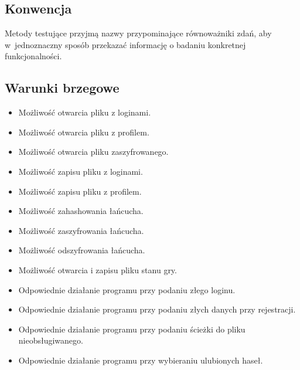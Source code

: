 \documentclass[a4paper]{article}
\begin{document}
\subsection{Konwencja}
Metody testujące przyjmą nazwy przypominające równoważniki zdań, aby w~jednoznaczny sposób przekazać informację o badaniu konkretnej funkcjonalności.


\subsection{Warunki brzegowe}
\begin{itemize}
    \item Możliwość otwarcia pliku z loginami.
    \item Możliwość otwarcia pliku z profilem.
    \item Możliwość otwarcia pliku zaszyfrowanego.
    \item Możliwość zapisu pliku z loginami.
    \item Możliwość zapisu pliku z profilem.
    \item Możliwość zahashowania łańcucha.
    \item Możliwość zaszyfrowania łańcucha.
    \item Możliwość odszyfrowania łańcucha.
    \item Możliwość otwarcia i zapisu pliku stanu gry.
    \item Odpowiednie działanie programu przy podaniu złego loginu.
    \item Odpowiednie działanie programu przy podaniu złych danych przy rejestracji.
    \item Odpowiednie działanie programu przy podaniu ścieżki do pliku nieobsługiwanego.
    \item Odpowiednie działanie programu przy wybieraniu ulubionych haseł.
\end{itemize}

\newpage
\end{document}
